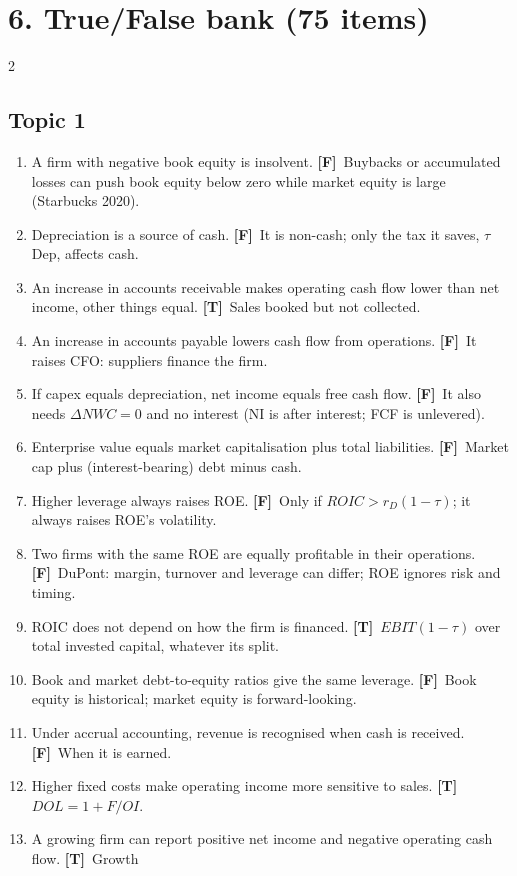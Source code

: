 \documentclass[10pt,a4paper]{article}
\newcommand{\blk}[1]{\subsection*{\color{hd}#1}}
\newcommand{\T}{\textbf{\color{ok}[T]}~}
\newcommand{\F}{\textbf{\color{wr}[F]}~}
\begin{document}
\section*{6. True/False bank (75 items)}
\begin{multicols}{2}\small
\blk{Topic 1}
\begin{enumerate}[label=\arabic*.,leftmargin=1.6em,itemsep=2pt]
  \item A firm with negative book equity is insolvent. \F Buybacks or accumulated losses can push
        book equity below zero while market equity is large (Starbucks 2020).
  \item Depreciation is a source of cash. \F It is non-cash; only the tax it saves, $\tau\,$Dep,
        affects cash.
  \item An increase in accounts receivable makes operating cash flow lower than net income, other
        things equal. \T Sales booked but not collected.
  \item An increase in accounts payable lowers cash flow from operations. \F It raises CFO: suppliers
        finance the firm.
  \item If capex equals depreciation, net income equals free cash flow. \F It also needs $\Delta
        NWC=0$ and no interest (NI is after interest; FCF is unlevered).
  \item Enterprise value equals market capitalisation plus total liabilities. \F Market cap plus
        (interest-bearing) debt minus cash.
  \item Higher leverage always raises ROE. \F Only if $ROIC>r_D(1-\tau)$; it always raises ROE's
        volatility.
  \item Two firms with the same ROE are equally profitable in their operations. \F DuPont: margin,
        turnover and leverage can differ; ROE ignores risk and timing.
  \item ROIC does not depend on how the firm is financed. \T $EBIT(1-\tau)$ over total invested
        capital, whatever its split.
  \item Book and market debt-to-equity ratios give the same leverage. \F Book equity is historical;
        market equity is forward-looking.
  \item Under accrual accounting, revenue is recognised when cash is received. \F When it is earned.
  \item Higher fixed costs make operating income more sensitive to sales. \T $DOL=1+F/OI$.
  \item A growing firm can report positive net income and negative operating cash flow. \T Growth

\end{enumerate}
\end{multicols}
\end{document}
